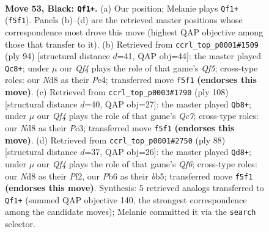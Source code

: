 \documentclass[11pt]{article}
\begin{document}
\clearpage

\begin{figure}[p]\centering
\begin{subfigure}{0.46\textwidth}\centering
\resizebox{\linewidth}{!}{%
\newchessgame
\chessboard[
  setfen={2kn2Q1/p1p3p1/1p4p1/2p2q2/8/2P5/1P6/K7 b - - 7 53},
  showmover=false,
  pgfstyle=straightmove, color=movearrow, markmove={f5-f1}
]}
\caption{}
\end{subfigure}\hfill
\begin{subfigure}{0.46\textwidth}\centering
\resizebox{\linewidth}{!}{%
\newchessgame
\chessboard[
  setfen={6k1/6p1/7p/5Q2/4P3/p2q3P/5PPK/8 w - - 2 48},
  showmover=false,
  pgfstyle=straightmove, color=movearrow, markmove={f5-c8}
]}
\caption{}
\end{subfigure}
\\[4pt]
\begin{subfigure}{0.46\textwidth}\centering
\resizebox{\linewidth}{!}{%
\newchessgame
\chessboard[
  setfen={6k1/2Q2p2/6p1/8/p3PP2/2P4P/6PK/2q5 w - - 9 55},
  showmover=false,
  pgfstyle=straightmove, color=movearrow, markmove={c7-b8}
]}
\caption{}
\end{subfigure}\hfill
\begin{subfigure}{0.46\textwidth}\centering
\resizebox{\linewidth}{!}{%
\newchessgame
\chessboard[
  setfen={6k1/8/p2P1Q2/1b5p/7P/6P1/3q1P1K/8 w - - 3 45},
  showmover=false,
  pgfstyle=straightmove, color=movearrow, markmove={f6-d8}
]}
\caption{}
\end{subfigure}
\caption{\textbf{Move 53, Black: \texttt{Qf1+}.} (a) Our position; Melanie plays \texttt{Qf1+} (\texttt{f5f1}). Panels (b)--(d) are the retrieved master positions whose correspondence most drove this move (highest QAP objective among those that transfer to it). (b) Retrieved from \texttt{ccrl\_top\_p0001\#1509} (ply 94) [structural distance $d$=41, QAP obj=44]: the master played \texttt{Qc8+}; under $\mu$ our \emph{Qf4} plays the role of that game's \emph{Qf5}; cross-type roles: our \emph{N}d8 as their \emph{P}e4; transferred move \texttt{f5f1} \textbf{(endorses this move)}. (c) Retrieved from \texttt{ccrl\_top\_p0003\#1790} (ply 108) [structural distance $d$=40, QAP obj=27]: the master played \texttt{Qb8+}; under $\mu$ our \emph{Qf4} plays the role of that game's \emph{Qc7}; cross-type roles: our \emph{N}d8 as their \emph{P}c3; transferred move \texttt{f5f1} \textbf{(endorses this move)}. (d) Retrieved from \texttt{ccrl\_top\_p0001\#2750} (ply 88) [structural distance $d$=37, QAP obj=26]: the master played \texttt{Qd8+}; under $\mu$ our \emph{Qf4} plays the role of that game's \emph{Qf6}; cross-type roles: our \emph{N}d8 as their \emph{P}f2, our \emph{P}b6 as their \emph{b}b5; transferred move \texttt{f5f1} \textbf{(endorses this move)}. Synthesis: 5 retrieved analogs transferred to \texttt{Qf1+} (summed QAP objective 140, the strongest correspondence among the candidate moves); Melanie committed it via the \texttt{search} selector.}
\label{fig:thought-m105}
\end{figure}
\end{document}
